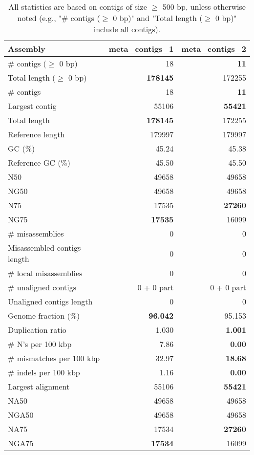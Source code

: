 \documentclass[12pt,a4paper]{article}
\begin{document}
\begin{table}[ht]
\begin{center}
\caption{All statistics are based on contigs of size $\geq$ 500 bp, unless otherwise noted (e.g., "\# contigs ($\geq$ 0 bp)" and "Total length ($\geq$ 0 bp)" include all contigs).}
\begin{tabular}{|l*{2}{|r}|}
\hline
Assembly & meta\_contigs\_1 & meta\_contigs\_2 \\ \hline
\# contigs ($\geq$ 0 bp) & 18 & {\bf 11} \\ \hline
Total length ($\geq$ 0 bp) & {\bf 178145} & 172255 \\ \hline
\# contigs & 18 & {\bf 11} \\ \hline
Largest contig & 55106 & {\bf 55421} \\ \hline
Total length & {\bf 178145} & 172255 \\ \hline
Reference length & 179997 & 179997 \\ \hline
GC (\%) & 45.24 & 45.38 \\ \hline
Reference GC (\%) & 45.50 & 45.50 \\ \hline
N50 & 49658 & 49658 \\ \hline
NG50 & 49658 & 49658 \\ \hline
N75 & 17535 & {\bf 27260} \\ \hline
NG75 & {\bf 17535} & 16099 \\ \hline
\# misassemblies & 0 & 0 \\ \hline
Misassembled contigs length & 0 & 0 \\ \hline
\# local misassemblies & 0 & 0 \\ \hline
\# unaligned contigs & 0 + 0 part & 0 + 0 part \\ \hline
Unaligned contigs length & 0 & 0 \\ \hline
Genome fraction (\%) & {\bf 96.042} & 95.153 \\ \hline
Duplication ratio & 1.030 & {\bf 1.001} \\ \hline
\# N's per 100 kbp & 7.86 & {\bf 0.00} \\ \hline
\# mismatches per 100 kbp & 32.97 & {\bf 18.68} \\ \hline
\# indels per 100 kbp & 1.16 & {\bf 0.00} \\ \hline
Largest alignment & 55106 & {\bf 55421} \\ \hline
NA50 & 49658 & 49658 \\ \hline
NGA50 & 49658 & 49658 \\ \hline
NA75 & 17534 & {\bf 27260} \\ \hline
NGA75 & {\bf 17534} & 16099 \\ \hline
\end{tabular}
\end{center}
\end{table}
\end{document}
